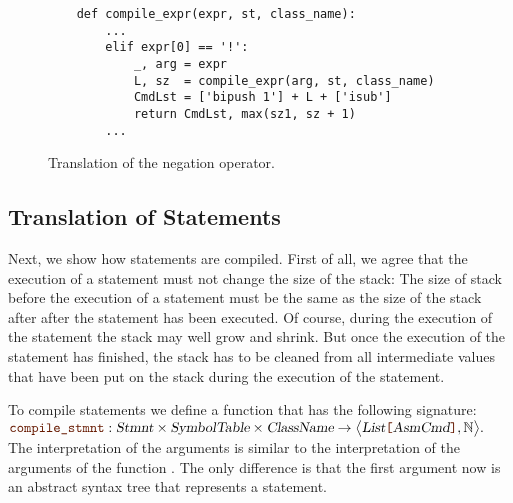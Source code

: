 \begin{figure}[!ht]
\centering
\begin{verbatim}
    def compile_expr(expr, st, class_name):
        ...
        elif expr[0] == '!':
            _, arg = expr
            L, sz  = compile_expr(arg, st, class_name)
            CmdLst = ['bipush 1'] + L + ['isub']
            return CmdLst, max(sz1, sz + 1)
        ...
\end{verbatim}
\vspace*{-0.3cm}
\caption{Translation of the negation operator.}
\label{fig:Compiler.ipynb:compile:not}
\end{figure}


\subsection{Translation of Statements}
Next, we show how statements are compiled.  First of all, we agree that the execution of a statement
must not change the size of the stack:  The size of stack before the execution of a statement must
be the same as the size of the stack after after the statement has been executed.
Of course, during the execution of the statement the stack may well
grow and shrink.  But once the execution of the statement has finished, the stack has to be cleaned from all
intermediate values that have been put on the stack during the execution of the statement.

To compile statements we define a function
 that has the following signature:
\\[0.2cm]
\hspace*{1.3cm}
$\mytt{compile\_stmnt}: \textsl{Stmnt} \times \textsl{SymbolTable} \times \textsl{ClassName} \rightarrow 
                 \bigl\langle\textsl{List}\mytt{[}\textsl{AsmCmd}\mytt{]}, \mathbb{N}\bigr\rangle.$
\\[0.2cm]
The interpretation of the arguments is similar to the interpretation of the arguments
of the function .  The only difference is that the first argument now is an abstract syntax
tree that represents a statement.

